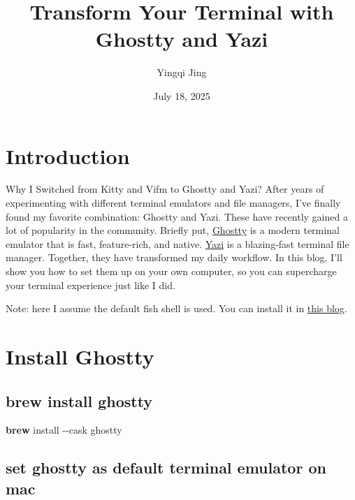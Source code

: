 \documentclass[
  letterpaper,
  DIV=11,
  numbers=noendperiod]{scrartcl}
\title{Transform Your Terminal with Ghostty and Yazi}
\author{Yingqi Jing}
\date{July 18, 2025}
\newenvironment{Shaded}{}{}
\newcommand{\AttributeTok}[1]{\textcolor[rgb]{0.65,0.15,0.64}{#1}}
\newcommand{\ExtensionTok}[1]{\textcolor[rgb]{0.25,0.47,0.95}{\textbf{#1}}}
\newcommand{\NormalTok}[1]{\textcolor[rgb]{0.22,0.23,0.26}{#1}}
\renewcommand*\contentsname{Table of contents}
\newcommand\contentsname{Table of contents}
\begin{document}
\maketitle

\renewcommand*\contentsname{Contents}
{
\hypersetup{linkcolor=}
\setcounter{tocdepth}{4}
\tableofcontents
}
\listoffigures
\listoftables

\clearpage

\section{Introduction}\label{introduction}

Why I Switched from Kitty and Vifm to Ghostty and Yazi? After years of
experimenting with different terminal emulators and file managers, I've
finally found my favorite combination: Ghostty and Yazi. These have
recently gained a lot of popularity in the community. Briefly put,
\href{https://github.com/ghostty-org/ghostty}{Ghostty} is a modern
terminal emulator that is fast, feature-rich, and native.
\href{https://github.com/sxyazi/yazi}{Yazi} is a blazing-fast terminal
file manager. Together, they have transformed my daily workflow. In this
blog, I'll show you how to set them up on your own computer, so you can
supercharge your terminal experience just like I did.

Note: here I assume the default fish shell is used. You can install it
in \href{https://medium.com/p/6f9610276c33}{this blog}.

\section{Install Ghostty}\label{install-ghostty}

\subsection{brew install ghostty}\label{brew-install-ghostty}

\begin{Shaded}
\begin{Highlighting}[]
\ExtensionTok{brew}\NormalTok{ install }\AttributeTok{{-}{-}cask}\NormalTok{ ghostty}
\end{Highlighting}
\end{Shaded}

\subsection{set ghostty as default terminal emulator on
mac}\label{set-ghostty-as-default-terminal-emulator-on-mac}
\end{document}

